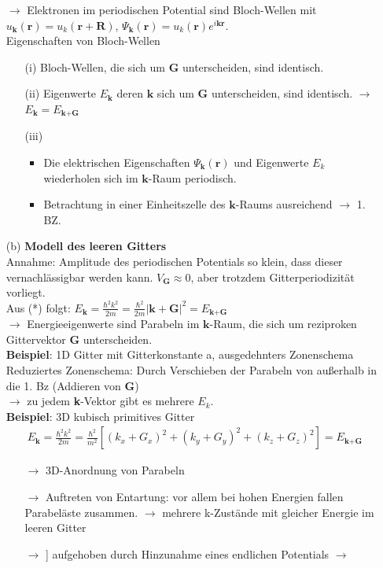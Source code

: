 \begin{itemize}
    $\rightarrow$ Elektronen im periodischen Potential sind Bloch-Wellen mit $u_{\textbf{k}}(\textbf{r}) = u_k(\textbf{r} + \textbf{R})$, $\Psi_{\textbf{k}} (\textbf{r}) = u_k(\textbf{r}) e^{i\textbf{k}\textbf{r}}$. \\
    Eigenschaften von Bloch-Wellen
    \begin{itemize}
        \item[(i)] Bloch-Wellen, die sich um $ \textbf{G} $ unterscheiden, sind identisch.
        \item[(ii)] Eigenwerte $E_{\textbf{k}}$ deren $ \textbf{k} $ sich um $ \textbf{G} $ unterscheiden, sind identisch. $\rightarrow$  $E_{\textbf{k}} = E_{\textbf{k}+\textbf{G}}$
        \item[(iii)]
        \begin{itemize}
            \item Die elektrischen Eigenschaften $\Psi_{\textbf{k}} (\textbf{r})$ und Eigenwerte $E_k$ wiederholen sich im $\textbf{k}$-Raum periodisch.
            \item Betrachtung in einer Einheitszelle des $\textbf{k}$-Raums ausreichend $\rightarrow$ 1. BZ.
        \end{itemize}
    \end{itemize}
    \item[(b)] \textbf{Modell des leeren Gitters}\\
    Annahme: Amplitude des periodischen Potentials so klein, dass dieser vernachlässigbar werden kann. $V_{\textbf{G}}\approx 0$, aber trotzdem Gitterperiodizität vorliegt.\\
    Aus (*) folgt: $ E_{\textbf{k}} = \frac{\hbar^2k^2}{2m} = \frac{\hbar^2}{2m} \left|\textbf{k}+\textbf{G}\right|^2 = E_{\textbf{k} + \textbf{G}}$ \\
    $\rightarrow$ Energieeigenwerte sind Parabeln im $\textbf{k}$-Raum, die sich um reziproken Gittervektor $\textbf{G}$ unterscheiden. \\
    \textbf{Beispiel}: 1D Gitter mit Gitterkonstante a, ausgedehnters Zonenschema \\ %
    Reduziertes Zonenschema: Durch Verschieben der Parabeln von außerhalb in die 1. Bz (Addieren von $\textbf{G}$) \\ %
    $\rightarrow$ zu jedem \textbf{k}-Vektor gibt es mehrere $E_k$. \\
    \textbf{Beispiel}: 3D kubisch primitives Gitter
    \begin{align}
        E_{\textbf{k}} = \frac{\hbar^2k^2}{2m} = \frac{\hbar^2}{m^2}\left[(k_x+G_x)^2 + (k_y+G_y)^2 + (k_z+G_z)^2\right] = E_{\textbf{k}+\textbf{G}}
    \end{align}
    \begin{itemize}
    \item[$\rightarrow$] 3D-Anordnung von Parabeln
    \item[$\rightarrow$] Auftreten von Entartung: vor allem bei hohen Energien fallen Parabeläste zusammen. $\rightarrow$ mehrere k-Zustände mit gleicher Energie im leeren Gitter
    \item[$\rightarrow$]] aufgehoben durch Hinzunahme eines endlichen Potentials $\rightarrow$ 
    \end{itemize}


\end{itemize}
